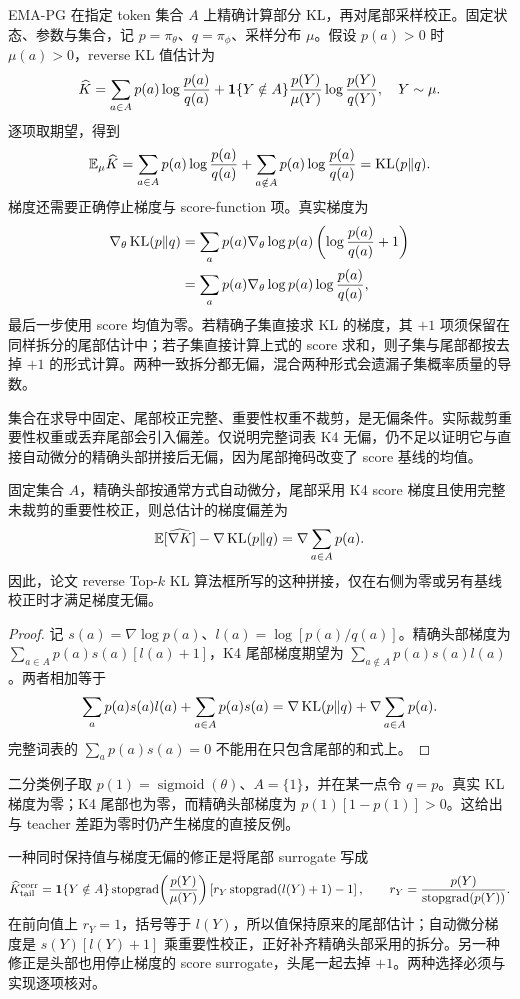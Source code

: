 EMA-PG 在指定 token 集合 $A$ 上精确计算部分 KL，再对尾部采样校正。固定状态、参数与集合，记 $p=\pi_\theta$、$q=\pi_\phi$、采样分布 $\mu$。假设 $p(a)>0$ 时 $\mu(a)>0$，reverse KL 值估计为
\[
 \widehat K=\sum_{a\in A}p(a)\log\frac{p(a)}{q(a)}
 +\mathbf{1}\{Y\notin A\}\frac{p(Y)}{\mu(Y)}\log\frac{p(Y)}{q(Y)},
 \quad Y\sim\mu.
\]
逐项取期望，得到
\[
 \mathbb{E}_\mu\widehat K=\sum_{a\in A}p(a)\log\frac{p(a)}{q(a)}
 +\sum_{a\notin A}p(a)\log\frac{p(a)}{q(a)}=\operatorname{KL}(p\Vert q).
\]
梯度还需要正确停止梯度与 score-function 项。真实梯度为
\begin{align*}
 \nabla_\theta\operatorname{KL}(p\Vert q)
 &=\sum_ap(a)\nabla_\theta\log p(a)
       \left(\log\frac{p(a)}{q(a)}+1\right)\\
 &=\sum_ap(a)\nabla_\theta\log p(a)\log\frac{p(a)}{q(a)},
\end{align*}
最后一步使用 score 均值为零。若精确子集直接求 KL 的梯度，其 $+1$ 项须保留在同样拆分的尾部估计中；若子集直接计算上式的 score 求和，则子集与尾部都按去掉 $+1$ 的形式计算。两种一致拆分都无偏，混合两种形式会遗漏子集概率质量的导数。

集合在求导中固定、尾部校正完整、重要性权重不裁剪，是无偏条件。实际裁剪重要性权重或丢弃尾部会引入偏差。仅说明完整词表 K4 无偏，仍不足以证明它与直接自动微分的精确头部拼接后无偏，因为尾部掩码改变了 score 基线的均值。

\begin{proposition}
\label{prop:topk-tail-baseline}
固定集合 $A$，精确头部按通常方式自动微分，尾部采用 K4 score 梯度且使用完整未裁剪的重要性校正，则总估计的梯度偏差为
\[
 \mathbb{E}[\widehat{\nabla K}]-\nabla\operatorname{KL}(p\Vert q)
 =\nabla\sum_{a\in A}p(a).
\]
因此，论文 reverse Top-$k$ KL 算法框所写的这种拼接，仅在右侧为零或另有基线校正时才满足梯度无偏。
\end{proposition}
\begin{proof}
记 $s(a)=\nabla\log p(a)$、$l(a)=\log[p(a)/q(a)]$。精确头部梯度为 $\sum_{a\in A}p(a)s(a)[l(a)+1]$，K4 尾部梯度期望为 $\sum_{a\notin A}p(a)s(a)l(a)$。两者相加等于
\[
 \sum_ap(a)s(a)l(a)+\sum_{a\in A}p(a)s(a)
 =\nabla\operatorname{KL}(p\Vert q)+\nabla\sum_{a\in A}p(a).
\]
完整词表的 $\sum_ap(a)s(a)=0$ 不能用在只包含尾部的和式上。
\end{proof}

二分类例子取 $p(1)=\operatorname{sigmoid}(\theta)$、$A=\{1\}$，并在某一点令 $q=p$。真实 KL 梯度为零；K4 尾部也为零，而精确头部梯度为 $p(1)[1-p(1)]>0$。这给出与 teacher 差距为零时仍产生梯度的直接反例。

一种同时保持值与梯度无偏的修正是将尾部 surrogate 写成
\[
 \widehat K_{\mathrm{tail}}^{\mathrm{corr}}
 =\mathbf{1}\{Y\notin A\}\operatorname{stopgrad}\!\left(\frac{p(Y)}{\mu(Y)}\right)
 \left[r_Y\operatorname{stopgrad}(l(Y)+1)-1\right],
 \qquad r_Y=\frac{p(Y)}{\operatorname{stopgrad}(p(Y))}.
\]
在前向值上 $r_Y=1$，括号等于 $l(Y)$，所以值保持原来的尾部估计；自动微分梯度是 $s(Y)[l(Y)+1]$ 乘重要性校正，正好补齐精确头部采用的拆分。另一种修正是头部也用停止梯度的 score surrogate，头尾一起去掉 $+1$。两种选择必须与实现逐项核对。

